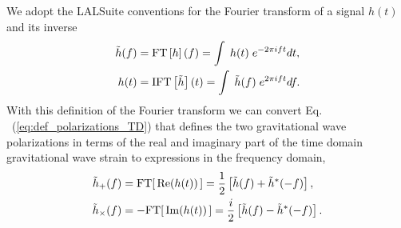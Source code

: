 \documentclass[%
aps,
prd,
amssymb,
amsmath,
amsfonts,
eqsecnum,
showpacs,
nofootinbib,
floatfix,
twocolumn,
twoside,
a4paper,
superscriptaddress
]{revtex4-1}
\newcommand{\FT}{{\rm{FT}}}
\newcommand{\IFT}{{\rm{IFT}}}
\newcommand{\gp}[1]{\textcolor{dodgerblue}{GP: #1}}
\newcommand{\cg}[1]{\textcolor{granadagreen}{CG: #1}}
\begin{document}

We adopt the LALSuite conventions for the Fourier transform of a signal $h(t)$ and its inverse
\begin{align}\label{eq:def_FFT}
    \tilde{h} (f) &= \FT \left[ h \right] (f) = \int \; h(t) \; e^{- 2 \pi i f t} dt, \\
    h (t) &= \IFT \left[ \tilde{h} \right] (t) = \int \; \tilde{h}(f) \; e^{2 \pi i f t} df .
\end{align}
With this definition of the Fourier transform we can convert Eq. ~(\ref{eq:def_polarizations_TD}) that defines the two gravitational wave polarizations in terms of the real and imaginary part of the time domain gravitational wave strain to expressions in the frequency domain,
\begin{align}
    \tilde{h}_{+} (f) &= \FT [ \, {\rm{Re}} ( h(t) ) \, ] = \frac{1}{2} \left[ \tilde{h}(f) + \tilde{h}^{\ast} (-f) \right] , \\ 
    \tilde{h}_{\times} (f) &= -\FT[ \, {\rm{Im}} ( h(t) ) \, ] = \frac{i}{2} \left[ \tilde{h}(f) - \tilde{h}^{\ast} (-f) \right] .
\end{align}
\end{document}
